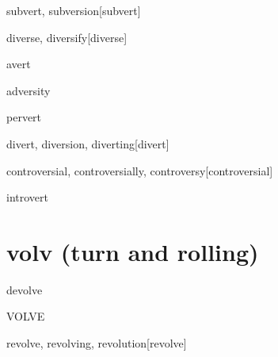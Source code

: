 \begin{wordRef}{subvert, subversion}[subvert]
\end{wordRef}

\begin{wordRef}{diverse, diversify}[diverse]
\end{wordRef}

\begin{wordRef}{avert}
\end{wordRef}

\begin{wordRef}{adversity}
\end{wordRef}

\begin{wordRef}{pervert}
\end{wordRef}

\begin{wordRef}{divert, diversion, diverting}[divert]
\end{wordRef}

\begin{wordRef}{controversial, controversially, controversy}[controversial]
\end{wordRef}

\begin{wordRef}{introvert}
\end{wordRef}

\section{volv (turn and rolling)}



\begin{wordRef}{devolve}
\end{wordRef}


\begin{wordRef}{VOLVE}
\end{wordRef}

\begin{wordRef}{revolve, revolving, revolution}[revolve]
\end{wordRef}

